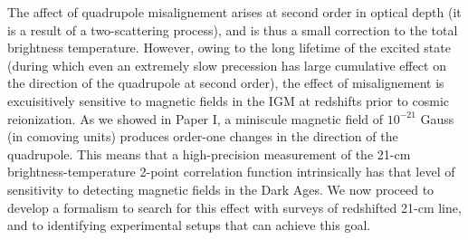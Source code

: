 The affect of quadrupole misalignement arises at second order in optical depth (it is a result of a two-scattering process), and is thus a small correction to the total brightness temperature. However, owing to the long lifetime of the excited state (during which even an extremely slow precession has large cumulative effect on the direction of the quadrupole at second order), the effect of misalignement is excuisitively sensitive to magnetic fields in the IGM at redshifts prior to cosmic reionization. As we showed in Paper I, a miniscule magnetic field of  $10^{-21}$ Gauss (in comoving units) produces order-one changes in the direction of the quadrupole. This means that a high-precision measurement of the 21-cm brightness-temperature 2-point correlation function intrinsically has that level of sensitivity to detecting magnetic fields in the Dark Ages. We now proceed to develop a formalism to search for this effect with surveys of redshifted 21-cm line, and to identifying experimental setups that can achieve this goal. 
